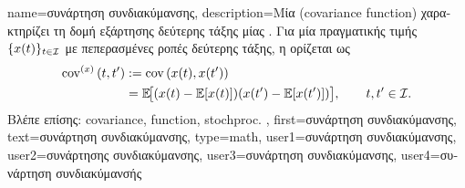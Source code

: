 {name={\foreignlanguage{greek}{συνάρτηση συνδιακύμανσης}},
	description={\foreignlanguage{greek}{Μία}  
		 (covariance function) \foreignlanguage{greek}{χαρακτηρίζει τη δομή εξάρτησης δεύτερης τάξης μίας}
		. \foreignlanguage{greek}{Για μία}  \foreignlanguage{greek}{πραγματικής τιμής 
		$\{x(t)\}_{t\in\mathcal{I}}$ με πεπερασμένες ροπές δεύτερης τάξης, η}
		  \foreignlanguage{greek}{ορίζεται ως} \cite{Rasmussen2006Gaussian}
		\begin{align}
				\nonumber
				{\rm cov}^{(x)}\left(t,t'\right) 
		& :=	{\rm cov}\left(x(t),x(t')\right) \nonumber \\ 
		& = 
		\mathbb{E}\!\big[(x(t)-\mathbb{E}[x(t)])
		                  (x(t')-\mathbb{E}[x(t')])\big],
		\qquad t,t'\in\mathcal{I}. \nonumber
		\end{align}
		\foreignlanguage{greek}{Βλέπε επίσης:} \gls{covariance}, \gls{function}, \gls{stochproc}. },
	first={\foreignlanguage{greek}{συνάρτηση συνδιακύμανσης}},
	text={\foreignlanguage{greek}{συνάρτηση συνδιακύμανσης}},
	type=math,
	user1={\foreignlanguage{greek}{συνάρτηση συνδιακύμανσης}}, %
	user2={\foreignlanguage{greek}{συνάρτησης συνδιακύμανσης}}, %
	user3={\foreignlanguage{greek}{συνάρτηση συνδιακύμανσης}}, %
	user4={\foreignlanguage{greek}{συνάρτηση συνδιακύμανσής}} %
}

